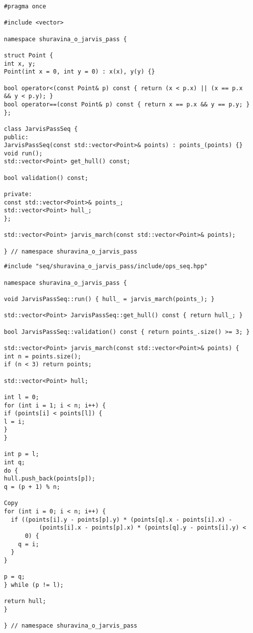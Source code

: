 \documentclass[12pt]{article}
\begin{document}
\newpage

\begin{lstlisting}[caption={ops_seq_.hpp}]
#pragma once

#include <vector>

namespace shuravina_o_jarvis_pass {

struct Point {
int x, y;
Point(int x = 0, int y = 0) : x(x), y(y) {}

bool operator<(const Point& p) const { return (x < p.x) || (x == p.x && y < p.y); }
bool operator==(const Point& p) const { return x == p.x && y == p.y; }
};

class JarvisPassSeq {
public:
JarvisPassSeq(const std::vector<Point>& points) : points_(points) {}
void run();
std::vector<Point> get_hull() const;

bool validation() const;

private:
const std::vector<Point>& points_;
std::vector<Point> hull_;
};

std::vector<Point> jarvis_march(const std::vector<Point>& points);

} // namespace shuravina_o_jarvis_pass
\end{lstlisting}

\newpage

\begin{lstlisting}[caption={ops_seq_.cpp}]
#include "seq/shuravina_o_jarvis_pass/include/ops_seq.hpp"

namespace shuravina_o_jarvis_pass {

void JarvisPassSeq::run() { hull_ = jarvis_march(points_); }

std::vector<Point> JarvisPassSeq::get_hull() const { return hull_; }

bool JarvisPassSeq::validation() const { return points_.size() >= 3; }

std::vector<Point> jarvis_march(const std::vector<Point>& points) {
int n = points.size();
if (n < 3) return points;

std::vector<Point> hull;

int l = 0;
for (int i = 1; i < n; i++) {
if (points[i] < points[l]) {
l = i;
}
}

int p = l;
int q;
do {
hull.push_back(points[p]);
q = (p + 1) % n;

Copy
for (int i = 0; i < n; i++) {
  if ((points[i].y - points[p].y) * (points[q].x - points[i].x) -
          (points[i].x - points[p].x) * (points[q].y - points[i].y) <
      0) {
    q = i;
  }
}

p = q;
} while (p != l);

return hull;
}

} // namespace shuravina_o_jarvis_pass
\end{lstlisting}
\end{document}
